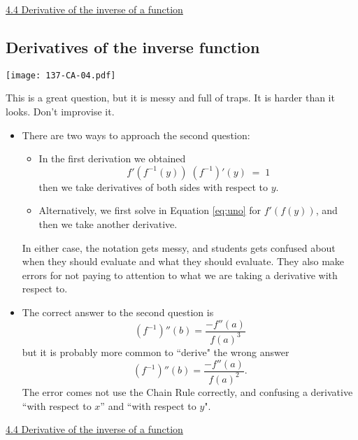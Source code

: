 \documentclass[11pt]{article}
\newcommand {\DS} [1] {${\displaystyle #1}$}
\newcommand{\nl}{\hfill \vspace{-1.1\baselineskip}} %
\newcommand{\viv}{\hspace{8mm} \href{https://www.youtube.com/watch?v=BMXesqZ_XCA&list=PLlwePzQY_wW-EDeUZebRoA8HGoeZxxpEU&index=4}{4.4 Derivative of the inverse of a function}}
\begin{document}
\begin{videos}
\viv
\end{videos}

\newpage
\subsection{Derivatives of the inverse function} 

\begin{center}
{ \texttt{[image: 137-CA-04.pdf]}} 
\end{center}


\begin{warning}
This is a great question, but it is messy and full of traps.  It is harder than it looks.  Don't improvise it.
\end{warning}

\begin{comments}
\nl
\begin{itemize}
	\item   There are two ways to approach the second question:
		\begin{itemize}
			\item  In the first derivation we obtained 
				\begin{equation} \label{eq:uno}
					f'(f^{-1}(y))\;  (f^{-1})'(y)\;  = \; 1
				\end{equation}
				then we take derivatives of both sides with respect to $y$.
			\item  Alternatively, we first solve in Equation \eqref{eq:uno} for \DS{f'(f(y))}, and then we take another derivative.
		\end{itemize}
	In either case, the notation gets messy, and students gets confused about when they should evaluate and what they should evaluate.  They also make errors for not paying to attention to what we are taking a derivative with respect to.
	\item The correct answer to the second question is 
		$$
			(f^{-1})''(b) =  \frac{- f''(a)}{f(a)^3}
		$$
		but it is probably more common to ``derive" the wrong answer
		$$
			(f^{-1})''(b) =  \frac{- f''(a)}{f(a)^2}.
		$$
		The error comes not use the Chain Rule correctly, and confusing a derivative ``with respect to $x$'' and ``with respect to $y$".
\end{itemize}	
\end{comments}

\begin{videos}
\viv
\end{videos}
\end{document}
